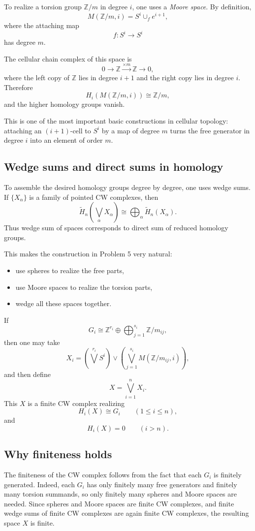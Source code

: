 \documentclass[12pt,a4paper]{article}
\theoremstyle{notespace}
\begin{document}
To realize a torsion group \(\mathbb Z/m\) in degree \(i\), one uses a \emph{Moore space}. By definition,
\[
M(\mathbb Z/m,i)=S^i\cup_f e^{i+1},
\]
where the attaching map
\[
f:S^i\to S^i
\]
has degree \(m\).

The cellular chain complex of this space is
\[
0\to \mathbb Z \xrightarrow{\times m} \mathbb Z \to 0,
\]
where the left copy of \(\mathbb Z\) lies in degree \(i+1\) and the right copy lies in degree \(i\). Therefore
\[
H_i(M(\mathbb Z/m,i))\cong \mathbb Z/m,
\]
and the higher homology groups vanish.

This is one of the most important basic constructions in cellular topology: attaching an \((i+1)\)-cell to \(S^i\) by a map of degree \(m\) turns the free generator in degree \(i\) into an element of order \(m\).

\subsection{Wedge sums and direct sums in homology}

To assemble the desired homology groups degree by degree, one uses wedge sums. If \(\{X_\alpha\}\) is a family of pointed CW complexes, then
\[
\widetilde H_n\!\left(\bigvee_\alpha X_\alpha\right)
\cong
\bigoplus_\alpha \widetilde H_n(X_\alpha).
\]
Thus wedge sum of spaces corresponds to direct sum of reduced homology groups.

This makes the construction in Problem 5 very natural:
\begin{itemize}
	\item use spheres to realize the free parts,
	\item use Moore spaces to realize the torsion parts,
	\item wedge all these spaces together.
\end{itemize}

If
\[
G_i \cong \mathbb Z^{r_i}\oplus \bigoplus_{j=1}^{s_i}\mathbb Z/m_{ij},
\]
then one may take
\[
X_i
=
\left(\bigvee^{r_i} S^i\right)
\vee
\left(\bigvee_{j=1}^{s_i} M(\mathbb Z/m_{ij},i)\right),
\]
and then define
\[
X=\bigvee_{i=1}^n X_i.
\]
This \(X\) is a finite CW complex realizing
\[
H_i(X)\cong G_i \qquad (1\le i\le n),
\]
and
\[
H_i(X)=0 \qquad (i>n).
\]

\subsection{Why finiteness holds}

The finiteness of the CW complex follows from the fact that each \(G_i\) is finitely generated. Indeed, each \(G_i\) has only finitely many free generators and finitely many torsion summands, so only finitely many spheres and Moore spaces are needed. Since spheres and Moore spaces are finite CW complexes, and finite wedge sums of finite CW complexes are again finite CW complexes, the resulting space \(X\) is finite.
\end{document}

